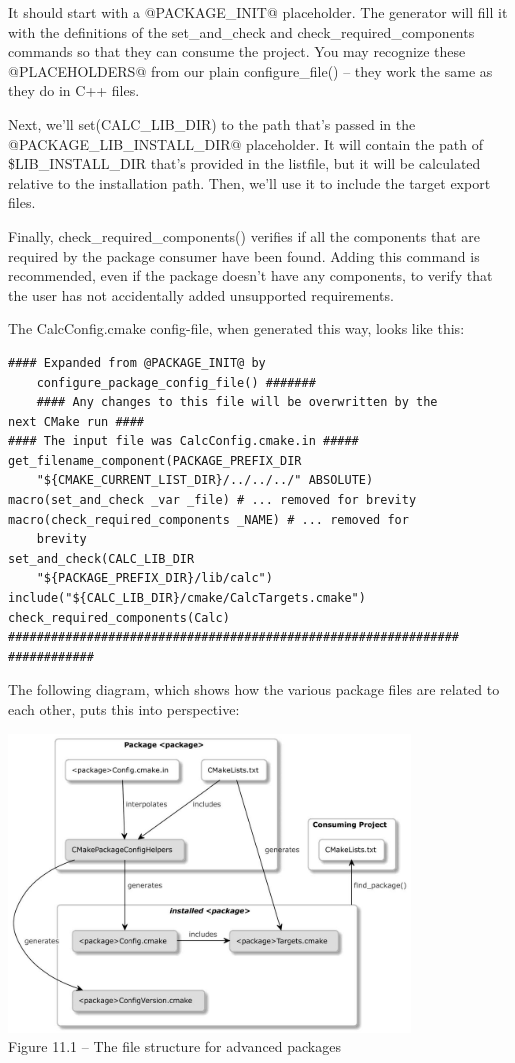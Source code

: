 It should start with a @PACKAGE\_INIT@ placeholder. The generator will fill it with the definitions of the set\_and\_check and check\_required\_components commands so that they can consume the project. You may recognize these @PLACEHOLDERS@ from our plain configure\_file() – they work the same as they do in C++ files.

Next, we'll set(CALC\_LIB\_DIR) to the path that's passed in the @PACKAGE\_LIB\_INSTALL\_DIR@ placeholder. It will contain the path of \$LIB\_INSTALL\_DIR that's provided in the listfile, but it will be calculated relative to the installation path. Then, we'll use it to include the target export files.

Finally, check\_required\_components() verifies if all the components that are required by the package consumer have been found. Adding this command is recommended, even if the package doesn't have any components, to verify that the user has not accidentally added unsupported requirements.

The CalcConfig.cmake config-file, when generated this way, looks like this:

\begin{lstlisting}[style=styleCMake]
#### Expanded from @PACKAGE_INIT@ by
	configure_package_config_file() #######
	#### Any changes to this file will be overwritten by the
next CMake run ####
#### The input file was CalcConfig.cmake.in #####
get_filename_component(PACKAGE_PREFIX_DIR
	"${CMAKE_CURRENT_LIST_DIR}/../../../" ABSOLUTE)
macro(set_and_check _var _file) # ... removed for brevity
macro(check_required_components _NAME) # ... removed for
	brevity
set_and_check(CALC_LIB_DIR
	"${PACKAGE_PREFIX_DIR}/lib/calc")
include("${CALC_LIB_DIR}/cmake/CalcTargets.cmake")
check_required_components(Calc)
###############################################################
############
\end{lstlisting}

The following diagram, which shows how the various package files are related to each other, puts this into perspective:

\begin{center}
\includegraphics[width=0.8\textwidth]{content/3/chapter11/images/1.jpg}\\
Figure 11.1 – The file structure for advanced packages
\end{center}

